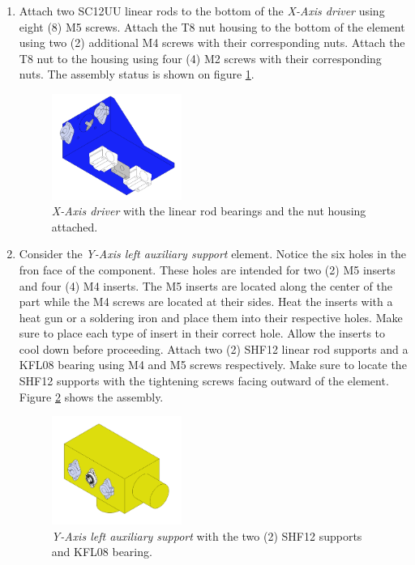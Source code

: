 \documentclass{article}
\begin{document}
\begin{enumerate}
    \item Attach two SC12UU linear rods to the bottom of the \textit{X-Axis driver} using eight (8) M5 screws. Attach the T8 nut housing to the bottom of the element using two (2) additional M4 screws with their corresponding nuts. Attach the T8 nut to the housing using four (4) M2 screws with their corresponding nuts. The assembly status is shown on figure \ref{fig:ya_step_6}.
    
    \begin{figure}[H]
        \centering
        \includegraphics[width=0.4\textwidth]{images/y_axis/step_F.png}
        \caption{\textit{X-Axis driver} with the linear rod bearings and the nut housing attached.}
        \label{fig:ya_step_6}
    \end{figure}
    
    \item Consider the \textit{Y-Axis left auxiliary support} element. Notice the six holes in the fron face of the component. These holes are intended for two (2) M5 inserts and four (4) M4 inserts. The M5 inserts are located along the center of the part while the M4 screws are located at their sides. Heat the inserts with a heat gun or a soldering iron and place them into their respective holes. Make sure to place each type of insert in their correct hole. Allow the inserts to cool down before proceeding. Attach two (2) SHF12 linear rod supports and a KFL08 bearing using M4 and M5 screws respectively. Make sure to locate the SHF12 supports with the tightening screws facing outward of the element. Figure \ref{fig:ya_step_7} shows the assembly.
    
    \begin{figure}[H]
        \centering
        \includegraphics[width=0.4\textwidth]{images/y_axis/step_G.png}
        \caption{\textit{Y-Axis left auxiliary support} with the two (2) SHF12 supports and KFL08 bearing.}
        \label{fig:ya_step_7}
    \end{figure}
    

\end{enumerate}
\end{document}
